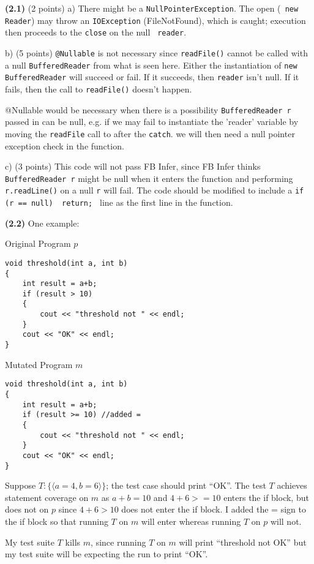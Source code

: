 \documentclass[11pt,onecolumn,letterpaper]{article}
\newcounter{qNum}
\newcommand{\q}[1]{%
\textbf{(#1)}\stepcounter{qNum}}
\begin{document}
\newpage

\q{2.1} (2 points) a) There might be a {\tt NullPointerException}. The open ({\tt
  new Reader}) may throw an {\tt IOException} (FileNotFound), which is
caught; execution then proceeds to the {\tt close} on the null {\tt
  reader}.

b) (5 points) {\tt @Nullable} is not necessary since {\tt readFile()} cannot be called with a null {\tt BufferedReader} from what is seen here. Either the instantiation of {\tt new BufferedReader} will succeed or fail. If it succeeds, then {\tt reader} isn't null. If it fails, then the call to {\tt readFile()} doesn't happen.

@Nullable would be necessary when there is a possibility {\tt BufferedReader r} passed in can be null, e.g. if we may fail to instantiate the 'reader' variable by moving the {\tt readFile} call to after the {\tt catch}. we will then need a null pointer exception check in the function.

c) (3 points) This code will not pass FB Infer, since FB Infer thinks {\tt BufferedReader r} might be null when it enters the function and performing {\tt r.readLine()} on a null {\tt r} will fail. The code should be modified to include a {\tt if (r == null) { return; }} line as the first line in the function.

\q{2.2} One example:

Original Program $p$
\begin{lstlisting}
void threshold(int a, int b)
{
    int result = a+b;
    if (result > 10)
    {
        cout << "threshold not " << endl;
    }
    cout << "OK" << endl;
}
\end{lstlisting}

Mutated Program $m$
\begin{lstlisting}
void threshold(int a, int b)
{
    int result = a+b;
    if (result >= 10) //added =
    {
        cout << "threshold not " << endl;
    }
    cout << "OK" << endl;
}
\end{lstlisting}

Suppose $T: \{ \langle a = 4, b = 6\rangle\}$; the test case should print ``OK''.
The test $T$ achieves statement coverage on $m$ as $a+b=10$ and $4+6>=10$ enters the if block, but does not on $p$ since $4+6>10$ does not enter the if block. I added the = sign to the if block so that running $T$ on $m$ will enter whereas running $T$ on $p$ will not.

My test suite $T$ kills $m$, since running $T$ on $m$ will print ``threshold not OK'' but my test suite will be expecting the run to print ``OK''.
\end{document}
